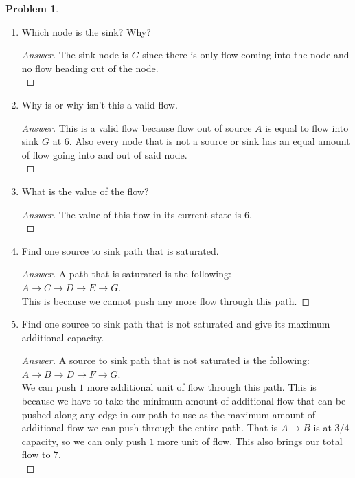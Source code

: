 \documentclass[11pt]{article}
\theoremstyle{definition}
\theoremstyle{definition}
\newtheorem{required}{Problem}
\theoremstyle{definition}
\begin{document}
\begin{required}
\begin{enumerate}
\item Which node is the sink? Why?
\begin{proof}[Answer]
The sink node is $G$ since there is only flow coming into the node and no flow heading out of the node.\\
\end{proof}

\item Why is or why isn't this a valid flow.
\begin{proof}[Answer]
This is a valid flow because flow out of source $A$ is equal to flow into sink $G$ at $6$. Also every node that is not a source or sink has an equal amount of flow going into and out of said node.\\
\end{proof}

\item What is the value of the flow?
\begin{proof}[Answer]
The value of this flow in its current state is $6$.\\
\end{proof}

\item Find one source to sink path that is saturated.
\begin{proof}[Answer]
A path that is saturated is the following:\\
$A \to C \to D \to E \to G$.\\
This is because we cannot push any more flow through this path.
\end{proof}

\item Find one source to sink path that is not saturated and give its maximum additional capacity.
\begin{proof}[Answer]
A source to sink path that is not saturated is the following: \\
$A \to B \to D \to F \to G$.\\
We can push $1$ more additional unit of flow through this path. This is because we have to take the minimum amount of additional flow that can be pushed along any edge in our path to use as the maximum amount of additional flow we can push through the entire path. That is $A \to B$ is at $3/4$ capacity, so we can only push $1$ more unit of flow. This also brings our total flow to $7$.\\
\end{proof}
\end{enumerate}





\end{required}
\end{document}
